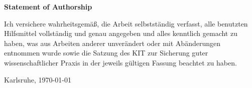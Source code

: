 \documentclass{thesisclass}
\begin{document}

\frontmatter
{}

\blankpage


\thispagestyle{plain}

\vspace*{\fill}

\centerline{\textbf{Statement of Authorship}}

\vspace{0.25cm}

Ich versichere wahrheitsgemäß, die Arbeit selbstständig verfasst, alle benutzten Hilfsmittel vollständig und genau angegeben und alles kenntlich gemacht zu haben, was aus Arbeiten anderer unverändert oder mit Abänderungen entnommen wurde sowie die Satzung des KIT zur Sicherung guter wissenschaftlicher Praxis in der jeweils gültigen Fassung beachtet zu haben.

\vspace{2.5cm}

\hspace{0.25cm} Karlsruhe, \today

\vspace{2cm}

\blankpage


\thispagestyle{plain}
\end{document}
